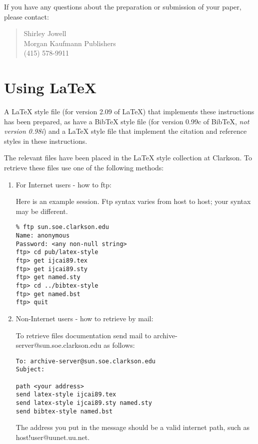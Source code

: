 If you have any questions about the preparation or submission of your
paper, please contact:
\begin{quote}
Shirley Jowell \\
Morgan Kaufmann Publishers \\
(415) 578-9911
\end{quote}

\appendix


\section{Using \LaTeX{}}\label{latex}

A \LaTeX{} style file (for version 2.09 of \LaTeX{}) that implements these
instructions has been prepared, as have a Bib\TeX{} style file (for version
0.99c of Bib\TeX{}, {\em not version 0.98i}) and a LaTeX style file that
implement the citation and reference styles in these instructions.

The relevant files have been placed in the \LaTeX{} style collection at
Clarkson.  To retrieve these files use one of the following methods:

\begin{enumerate} 
\item For Internet users - how to ftp:

Here is an example session.  Ftp syntax varies from host to
host; your syntax may be different.

\begin{verbatim}
% ftp sun.soe.clarkson.edu
Name: anonymous
Password: <any non-null string>
ftp> cd pub/latex-style
ftp> get ijcai89.tex
ftp> get ijcai89.sty
ftp> get named.sty
ftp> cd ../bibtex-style
ftp> get named.bst
ftp> quit
\end{verbatim}

\item  Non-Internet users - how to retrieve by mail:

To retrieve files documentation send mail to
archive-server@sun.soe.clarkson.edu as follows:

\begin{verbatim}
To: archive-server@sun.soe.clarkson.edu
Subject:

path <your address>
send latex-style ijcai89.tex
send latex-style ijcai89.sty named.sty
send bibtex-style named.bst
\end{verbatim}

The address you put in the message should be a valid internet path,
such as host!user@uunet.uu.net.

\end{enumerate}

